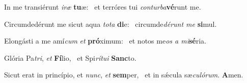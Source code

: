 \item In me transiérunt \textit{iræ} \textbf{tu}æ:~\psstar{} et terróres tui \textit{conturba}\textbf{vé}runt me.
\item Circumdedérunt me sicut aqua \textit{tota} \textbf{di}e:~\psstar{} circumde\textit{dérunt me} \textbf{si}mul.
\item Elongásti a me amí\textit{cum} \textit{et} \textbf{pró}ximum:~\psstar{} et notos me\textit{os a mi}\textbf{sé}ria.
\item Glória Pa\textit{tri}, \textit{et} \textbf{Fí}lio,~\psstar{} et Spi\textit{rítui} \textbf{Sanc}to.
\item Sicut erat in princípio, et \textit{nunc}, \textit{et} \textbf{sem}per,~\psstar{} et in sǽcula sæ\textit{culórum}. \textbf{A}men.
